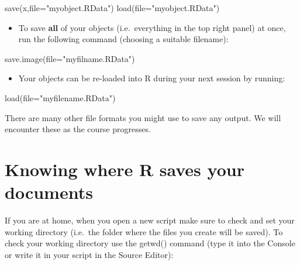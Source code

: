 \documentclass[
  letterpaper,
  DIV=11,
  numbers=noendperiod]{scrreprt}
\newenvironment{Shaded}{\begin{snugshade}}{\end{snugshade}}
\newcommand{\AttributeTok}[1]{\textcolor[rgb]{0.40,0.45,0.13}{#1}}
\newcommand{\FunctionTok}[1]{\textcolor[rgb]{0.28,0.35,0.67}{#1}}
\newcommand{\NormalTok}[1]{\textcolor[rgb]{0.00,0.23,0.31}{#1}}
\newcommand{\StringTok}[1]{\textcolor[rgb]{0.13,0.47,0.30}{#1}}
\providecommand{\tightlist}{%
  \setlength{\itemsep}{0pt}\setlength{\parskip}{0pt}}\usepackage{longtable,booktabs,array}
\begin{document}
\begin{Shaded}
\begin{Highlighting}[]
\FunctionTok{save}\NormalTok{(x,}\AttributeTok{file=}\StringTok{"myobject.RData"}\NormalTok{)}
\FunctionTok{load}\NormalTok{(}\AttributeTok{file=}\StringTok{"myobject.RData"}\NormalTok{)}
\end{Highlighting}
\end{Shaded}

\begin{itemize}
\tightlist
\item
  To save \textbf{all} of your objects (i.e.~everything in the top right
  panel) at once, run the following command (choosing a suitable
  filename):
\end{itemize}

\begin{Shaded}
\begin{Highlighting}[]
\FunctionTok{save.image}\NormalTok{(}\AttributeTok{file=}\StringTok{"myfilname.RData"}\NormalTok{)}
\end{Highlighting}
\end{Shaded}

\begin{itemize}
\tightlist
\item
  Your objects can be re-loaded into R during your next session by
  running:
\end{itemize}

\begin{Shaded}
\begin{Highlighting}[]
\FunctionTok{load}\NormalTok{(}\AttributeTok{file=}\StringTok{"myfilename.RData"}\NormalTok{)}
\end{Highlighting}
\end{Shaded}

There are many other file formats you might use to save any output. We
will encounter these as the course progresses.

\hypertarget{knowing-where-r-saves-your-documents}{%
\section*{Knowing where R saves your
documents}\label{knowing-where-r-saves-your-documents}}

If you are at home, when you open a new script make sure to check and
set your working directory (i.e.~the folder where the files you create
will be saved). To check your working directory use the getwd() command
(type it into the Console or write it in your script in the Source
Editor):
\end{document}
